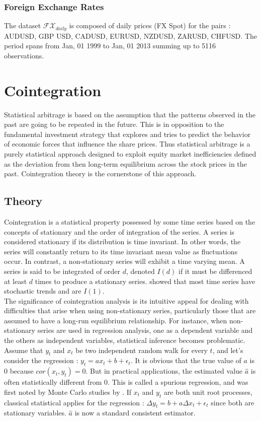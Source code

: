 \documentclass[11pt,a4,twosided,singlespacing,titlepagenumber=on]{scrreprt}
\numberwithin{equation}{chapter} %
\theoremstyle{remark}
\begin{document}
\subsection{Foreign Exchange Rates}
The dataset $\mathcal{FX}_{daily}$ is composed of daily prices (FX Spot) for the pairs : AUDUSD, GBP USD, CADUSD, EURUSD, NZDUSD, ZARUSD, CHFUSD. The period spans from Jan, 01 1999 to Jan, 01 2013 summing up to 5116 observations.

\chapter{Cointegration}

Statistical arbitrage is based on the assumption that the patterns observed in the past are going to be repeated in the future. This is in opposition to the fundamental investment strategy that explores and tries to predict the behavior of economic forces that influence the share prices. Thus statistical arbitrage is a purely statistical approach designed to exploit equity market inefficiencies defined as the deviation from then long-term equilibrium across the stock prices in the past. Cointegration theory is the cornerstone of this approach. 

\section{Theory}
Cointegration is a statistical property possessed by some time series based on the concepts of stationary and the order of integration of the series. A series is considered stationary if its distribution is time invariant. In other words, the series will constantly return to its time invariant mean value as fluctuations occur. In contrast, a non-stationary series will exhibit a time varying mean. A series is said to be integrated of order $d$, denoted $I(d)$ if it must be differenced at least $d$ times to produce a stationary series.
\cite{nelson1982} showed that most time series have stochastic trends and are $I(1)$. \\


The significance of cointegration analysis is its intuitive appeal for dealing with difficulties that arise when using non-stationary series, particularly those that are assumed to have a long-run equilibrium relationship. For instance, when non-stationary series are used in regression analysis, one as a dependent variable and the others as independent variables, statistical inference becomes problematic. Assume that $y_t$ and $x_t$ be two independent random walk for every $t$, and let's consider the regression : $y_t = a x_t + b + \epsilon_t$. It is obvious that the true value of $a$ is 0 because $cor(x_t, y_t) = 0$. But in practical applications, the estimated value $\hat{a}$ is often statistically different from 0. This is called a spurious regression, and was first noted by Monte Carlo studies by \cite{granger1974}. If $x_t$ and $y_t$ are both unit root processes, classical statistical applies for the regression : $\Delta y_t = b + a \Delta x_t + \epsilon_t$ since both are stationary variables. $\hat{a}$ is now a standard consistent estimator. \\
\end{document}
